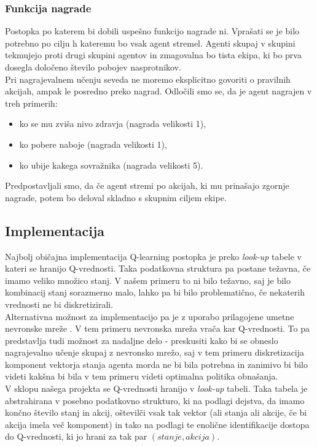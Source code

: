 \documentclass[a4paper,10pt]{article}
\begin{document}
\subsubsection{Funkcija nagrade}
Postopka po katerem bi dobili uspešno funkcijo nagrade ni. Vprašati se je bilo potrebno po cilju h kateremu bo vsak agent stremel. Agenti skupaj v skupini
tekmujejo proti drugi skupini agentov in zmagovalna bo tista ekipa, ki bo prva dosegla določeno število pobojev nasprotnikov.\\
Pri nagrajevalnem učenju seveda ne moremo eksplicitno govoriti o pravilnih akcijah, ampak le posredno preko nagrad. Odločili smo se, da je agent nagrajen v 
treh primerih:
\begin{itemize}
 \item ko se mu zviša nivo zdravja (nagrada velikosti 1),
 \item ko pobere naboje (nagrada velikosti 1),
 \item ko ubije kakega sovražnika (nagrada velikosti 5).
\end{itemize}
Predpostavljali smo, da če agent stremi po akcijah, ki mu prinašajo zgornje nagrade, potem bo deloval skladno s skupnim ciljem ekipe.

\subsection{Implementacija}
Najbolj običajna implementacija Q-learning postopka je preko \textit{look-up} tabele v kateri se hranijo Q-vrednosti. Taka podatkovna struktura pa 
postane težavna, če imamo veliko množico stanj. V našem primeru to ni bilo težavno, saj je bilo kombinacij stanj sorazmerno malo, lahko pa bi bilo
problematično, če nekaterih vrednosti ne bi diskretizirali.\\
Alternativna možnost za implementacijo pa je z uporabo prilagojene umetne nevronske mreže \cite{ql}. V tem primeru nevronska mreža vrača kar
Q-vrednosti. To pa predstavlja tudi možnost za nadaljne delo - preskusiti kako bi se obneslo nagrajevalno učenje skupaj z nevronsko mrežo, saj
v tem primeru diskretizacija komponent vektorja stanja agenta morda ne bi bila potrebna in zanimivo bi bilo videti kakšna bi bila v tem primeru
videti optimalna politika obnašanja.\\
V sklopu našega projekta se Q-vrednosti hranijo v \textit{look-up} tabeli. Taka tabela je abstrahirana v posebno podatkovno strukturo, ki na podlagi dejstva, 
da imamo končno število stanj in akcij, oštevilči vsak tak vektor (ali stanja ali akcije, če bi akcija imela več komponent) in tako na podlagi te enolične 
identifikacije dostopa do Q-vrednosti, ki jo hrani za tak par $(stanje, akcija)$.
\end{document}

